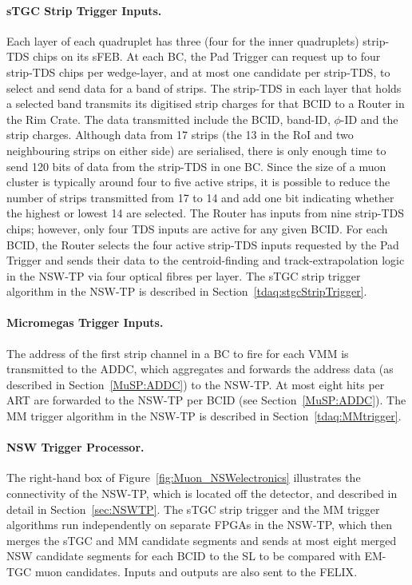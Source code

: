 \documentclass[cernpreprint, atlasdraft=false, UKenglish,british,orcidlogo, texmf, orcidlogo]{atlasdoc}
\begin{document}
\paragraph{sTGC Strip Trigger Inputs. \label{muonSS:stgcStripTrigger}}
Each layer of each quadruplet has three (four for the inner quadruplets) strip-\gls{TDS} chips on its \gls{sFEB}.
At each \gls{BC}, the Pad Trigger can request up to four strip-\gls{TDS} chips per wedge-layer, and at most one candidate per strip-\gls{TDS}, to select and send data for a band of strips.
The strip-\gls{TDS} in each layer that holds a selected band transmits its digitised strip charges for that \gls{BCID} to a Router in the Rim Crate.
The data transmitted include the \gls{BCID}, band-ID, $\phi$-ID and the strip charges.
Although data from 17 strips (the 13 in the \gls{RoI} and two neighbouring strips on either side) are serialised, there is only enough time to send 120 bits of data from the strip-\gls{TDS} in one \gls{BC}.
Since the size of a muon cluster is typically around four to five active strips, it is possible to reduce the number of strips transmitted from 17 to 14 and add one bit indicating whether the highest or lowest 14 are selected.
The Router has inputs from nine strip-\gls{TDS} chips; however, only four \gls{TDS} inputs are active for any given \gls{BCID}.
For each \gls{BCID}, the Router selects the four active strip-\gls{TDS} inputs requested by the Pad Trigger and sends their data to the centroid-finding and track-extrapolation logic in the \gls{NSW-TP} via four optical fibres per layer.
The \gls{sTGC} strip trigger algorithm in the \gls{NSW-TP} is described in Section~\ref{tdaq:stgcStripTrigger}.
 
\paragraph{Micromegas Trigger Inputs. \label{muonSS:MMtrigger}}
The address of the first strip channel in a \gls{BC} to fire for each \gls{VMM} is transmitted to the \gls{ADDC}, which aggregates and forwards the address data (as described in Section~\ref{MuSP:ADDC}) to the \gls{NSW-TP}.
At most eight hits per \gls{ART} are forwarded to the \gls{NSW-TP} per \gls{BCID} (see Section~\ref{MuSP:ADDC}).
The \gls{MM} trigger algorithm in the \gls{NSW-TP} is described in Section~\ref{tdaq:MMtrigger}.
 
 
\paragraph{NSW Trigger Processor. }
The right-hand box of Figure~\ref{fig:Muon_NSWelectronics} illustrates the connectivity of the \gls{NSW-TP}, which is located off the detector, and described in detail in Section~\ref{sec:NSWTP}.
The \gls{sTGC} strip trigger and the \gls{MM} trigger algorithms run independently on separate \glspl{FPGA} in the \gls{NSW-TP}, which then merges the \gls{sTGC} and \gls{MM} candidate segments and sends at most eight merged \gls{NSW} candidate segments for each \gls{BCID} to the \gls{SL} to be compared with \gls{EM-TGC} muon candidates. Inputs and outputs are also sent to the \gls{FELIX}.
 
\end{document}
